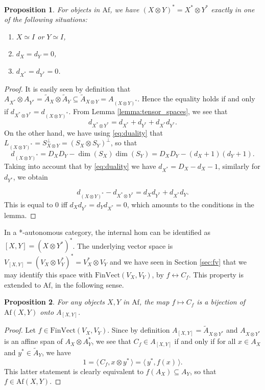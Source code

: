 \documentclass[12pt]{article}
\newtheorem{prop}{Proposition}
\theoremstyle{definition}
\theoremstyle{remark}
\def\<{\langle\,}
\def\>{\,\rangle}
\def \Af{\mathrm{Af}}
\def \FV{\mathrm{FinVect}}
\begin{document}
\begin{prop}\label{prop:noncompact} For objects in $\Af$, we have $(X\otimes
Y)^*=X^*\otimes Y^*$ exactly in one of the following situations:
\begin{enumerate}
\item[(i)] $X\simeq I$ or $Y\simeq I$,
\item[(ii)] $d_X=d_Y=0$,
\item[(iii)] $d_{X^*}=d_{Y^*}=0$.
\end{enumerate}



\end{prop}

\begin{proof} It is easily seen by definition that $A_{X^*}\otimes A_{Y^*}=\tilde A_X\otimes \tilde
A_Y\subseteq \tilde A_{X\otimes Y}=A_{(X\otimes Y)^*}$. Hence the equality holds if and
only if $d_{X^*\otimes Y^*}=d_{(X\otimes Y)^*}$. From Lemma
\ref{lemma:tensor_spaces}, we see that
\[
d_{X^*\otimes Y^*}=d_{X^*}+d_{Y^*}+d_{X^*}d_{Y^*}.
\]
On the other hand, we have using \eqref{eq:duality} that $L_{(X\otimes Y)^*}=S_{X\otimes
Y}^\perp=(S_X\otimes S_Y)^\perp$, so that
\[
d_{(X\otimes Y)^*}=D_XD_Y-\dim(S_X)\dim(S_Y)=D_XD_Y-(d_X+1)(d_Y+1).
\]
Taking into account that by \eqref{eq:duality} we have $d_{X^*}=D_X-d_{X}-1$, similarly
for $d_{Y^*}$, we obtain

\[
d_{(X\otimes Y)^*}-d_{X^*\otimes Y^*}=d_Xd_{Y^*}+d_{X^*}d_Y.
\]
This is equal to 0 iff $d_Xd_{Y^*}=d_Yd_{X^*}=0$, which amounts to the conditions in the
lemma.

\end{proof}



In a *-autonomous category, the internal hom can be identified as $[X,Y]=(X\otimes
Y^*)^*$. The underlying vector space is $V_{[X,Y]}=(V_X\otimes V_Y^*)^*=V_X^*\otimes V_Y$
and we have seen in Section \ref{sec:fv} that we may identify this space with
$\FV(V_X,V_Y)$, by $f \leftrightarrow C_f$. This property is extended to $\Af$, in the
following sense.

\begin{prop}\label{prop:ihom_morphisms} For any objects $X,Y$ in $\Af$, the map $f\mapsto C_f$ is a bijection
of $\Af(X,Y)$ onto $A_{[X,Y]}$. 

\end{prop}

\begin{proof} Let $f\in \FV(V_X,V_Y)$. Since by definition $A_{[X,Y]}=\tilde A_{X\otimes Y^*}$ and $A_{X\otimes
Y^*}$ is an affine span of $A_X\otimes A_Y^*$, we see that $C_f\in A_{[X,Y]}$ if and only
if for all $x\in A_X$ and $y^*\in \tilde A_Y$, we have
\[
1=\<C_f, x\otimes y^*\>=\<y^*,f(x)\>.
\]
This latter statement is clearly equivalent to $f(A_X)\subseteq A_Y$, so that $f\in
\Af(X,Y)$. 
\end{proof}
\end{document}
